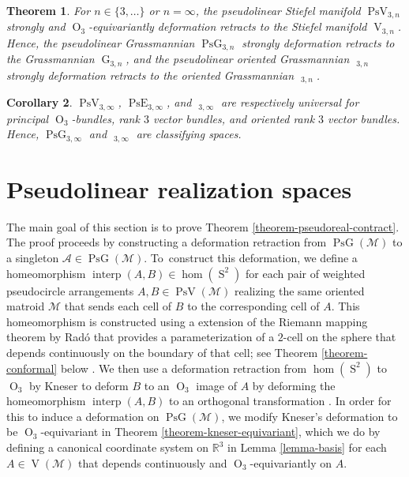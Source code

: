 \documentclass[JEP,XML,SOM,Unicode,NoFloatCountersInSection,published]{cedram}
\newtheorem{theorem}{Theorem}[subsection]
\newtheorem{corollary}[theorem]{Corollary}
\theoremstyle{remark}
\let\mc\mathcal
\let\mb\mathbb
\DeclareMathOperator{\pg}{PsG}
\DeclareMathOperator{\pog}{Ps\widetilde G}
\DeclareMathOperator{\pe}{PsE}
\DeclareMathOperator{\g}{G}
\DeclareMathOperator{\oG}{\widetilde G}
\DeclareMathOperator{\poe}{Ps\widetilde{E}}
\DeclareMathOperator{\orth}{O}
\DeclareMathOperator{\stief}{V}
\DeclareMathOperator{\pstief}{PsV}
\DeclareMathOperator{\sphere}{S}
\DeclareMathOperator{\interp}{interp}
\begin{document}
\begin{theorem}\label{theorem-grassman-pseudograssman}
For $n \in \{3,\dots\}$ or $n = \infty$,
the pseudolinear Stiefel manifold $\pstief_{3,n}$ strongly and $\orth_3$-equivariantly deformation retracts to the Stiefel manifold $\stief_{3,n}$. Hence, the pseudolinear Grassmannian $\pg_{3,n}$ strongly deformation retracts to the Grassmannian $\g_{3,n}$, and the pseudolinear oriented Grassmannian $\pog_{3,n}$ strongly deformation retracts to the oriented Grassmannian $\oG_{3,n}$.
\end{theorem}

\begin{corollary}\label{corollary-classifying}
$\pstief_{3,\infty}$, $\pe_{3,\infty}$, and $\poe_{3,\infty}$ are respectively universal for principal $\orth_3$-bundles, rank $3$ vector bundles, and oriented rank $3$ vector bundles.
Hence, $\pg_{3,\infty}$ and $\pog_{3,\infty}$ are classifying spaces.
\end{corollary}

\section{Pseudolinear realization spaces}\label{section-contractible}

The main goal of this section is to prove Theorem \ref{theorem-pseudoreal-contract}.
The proof proceeds by constructing a deformation retraction from $\pg(\mc{M})$ to a singleton $\mc{A} \in \pg(\mc{M})$. To~construct this deformation, we define a homeomorphism $\interp(A,B) \in \hom(\sphere^2)$ for each pair of weighted pseudocircle arrangements $A,B \in \pstief(\mc{M})$ realizing the same oriented matroid $\mc{M}$ that sends each cell of $B$ to the corresponding cell of $A$. This homeomorphism is constructed using a extension of the Riemann mapping theorem by Radó that provides a parameterization of a $2$-cell on the sphere that depends continuously on the boundary of that cell; see Theorem \ref{theorem-conformal} below \cite{rado1923representation}. We then use a deformation retraction from $\hom(\sphere^2)$ to $\orth_3$ by Kneser to deform $B$ to an $\orth_3$ image of $A$ by deforming the homeomorphism $\interp(A,B)$ to an orthogonal transformation \cite{kneser1926deformationssatze}. In order for this to induce a deformation on $\pg(\mc{M})$, we modify Kneser's deformation to be $\orth_3$-equivariant in Theorem \ref{theorem-kneser-equivariant}, which we do by defining a canonical coordinate system on $\mb{R}^3$ in Lemma \ref{lemma-basis} for each $A \in \stief(\mc{M})$ that depends continuously and $\orth_3$-equivariantly on $A$.
\end{document}
